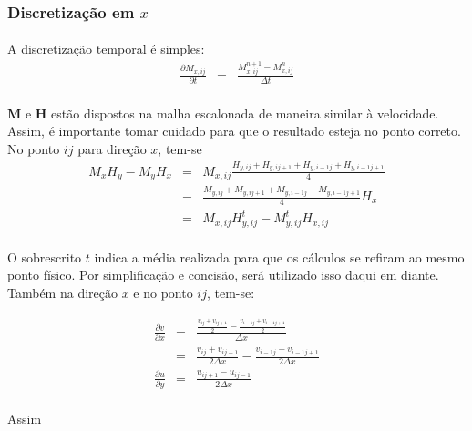 \documentclass[eletromagnetismo.tex]{subfiles}
\begin{document}
\subsubsection{Discretização em $x$}

\paragraph{} A discretização temporal é simples:
\begin{eqnarray}
	\frac{\partial M_{x,ij}}{\partial t} & = & \frac{M_{x,ij}^{n+1} - M_{x,ij}^n}{\Delta t}
\end{eqnarray}

\paragraph{} $\mathbf{M}$ e $\mathbf{H}$ estão dispostos na malha escalonada de maneira similar à velocidade. Assim, é importante tomar cuidado para que o resultado esteja no ponto correto. No ponto $ij$ para direção $x$, tem-se \begin{eqnarray}
M_x H_y - M_y H_x & = & M_{x,ij} \frac{H_{y,ij}+H_{y,ij+1}+H_{y,i-1j}+H_{y,i-1j+1}}{4}\\ &-& \frac{M_{y,ij}+M_{y,ij+1}+M_{y,i-1j}+M_{y,i-1j+1}}{4} H_x\\
&=& M_{x,ij} H_{y,ij}^t - M_{y,ij}^t H_{x,ij}
\end{eqnarray}

\paragraph{} O sobrescrito $t$ indica a média realizada para que os cálculos se refiram ao mesmo ponto físico. Por simplificação e concisão, será utilizado isso daqui em diante. Também na direção $x$ e no ponto $ij$, tem-se:

\begin{eqnarray}
	\frac{\partial v}{\partial x} & = & \frac{\frac{v_{ij} + v_{ij+1}}{2} - \frac{v_{i-1j} + v_{i-1j+1}}{2}}{\Delta x}\\
	&=& \frac{v_{ij} + v_{ij+1}}{2\Delta x} - \frac{v_{i-1j} + v_{i-1j+1}}{2\Delta x}\\
	\frac{\partial u}{\partial y} & = & \frac{u_{ij+1} - u_{ij-1}}{2\Delta x}
\end{eqnarray}

\paragraph{} Assim
\end{document}
